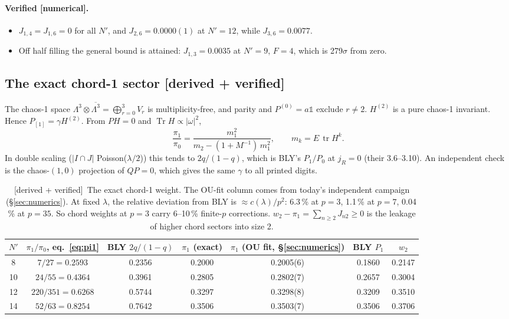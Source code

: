 \documentclass[11pt]{article}
\newcommand{\Tr}{\operatorname{Tr}}
\newcommand{\tr}{\operatorname{tr}}
\newcommand{\Np}{N'}
\newcommand{\one}{\mathds 1}
\newcommand{\tagbox}[2]{\textsf{\small\color{#1}[#2]}}
\newcommand{\VER}{\tagbox{cder}{derived + verified}}
\newcommand{\NUM}{\tagbox{cnum}{numerical}}
\theoremstyle{remark}
\begin{document}
\paragraph{Verified \NUM.}
\begin{itemize}\itemsep1pt
\item $J_{1,4}=J_{1,6}=0$ for all $\Np$, and $J_{2,6}=0.0000(1)$ at $\Np=12$, while $J_{3,6}=0.0077$.
\item Off half filling the general bound is attained: $J_{1,3}=0.0035$ at $\Np=9$, $F=4$, which is 279$\sigma$ from zero.
\end{itemize}

\subsection{The exact chord-1 sector \VER}
The chaos-1 space $\Lambda^3\otimes\overline{\Lambda^3}=\bigoplus_{r=0}^3V_r$ is multiplicity-free, and parity and
$P^{(0)}=a\one$ exclude $r\ne2$. $H^{(2)}$ is a pure chaos-1 invariant. Hence $P_{[1]}=\gamma H^{(2)}$. From $PH=0$ and
$\Tr H\propto|\omega|^2$,
\begin{equation}
\frac{\pi_1}{\pi_0}=\frac{m_1^2}{m_2-(1+M^{-1})\,m_1^2},\qquad m_k=E\,\tr H^k .
\label{eq:pi1}
\end{equation}
In double scaling ($|I\cap J|$ Poisson($\lambda/2$)) this tends to $2q/(1-q)$, which is BLY's $P_1/P_0$ at $j_R=0$
(their 3.6--3.10). An independent check is the chaos-$(1,0)$ projection of $QP=0$, which gives the same $\gamma$ to all
printed digits.

\begin{table}[!htbp]
\centering\small
\begin{tabular}{@{}ccccccc@{}}
\toprule
$\Np$ & $\pi_1/\pi_0$, eq.~\eqref{eq:pi1} & BLY $2q/(1-q)$ & $\pi_1$ (exact) & $\pi_1$ (OU fit, \S\ref{sec:numerics}) & BLY $P_1$ & $w_2$\\
\midrule
8 & $7/27=0.2593$ & 0.2356 & 0.2000 & 0.2005(6) & 0.1860 & 0.2147\\
10 & $24/55=0.4364$ & 0.3961 & 0.2805 & 0.2802(7) & 0.2657 & 0.3004\\
12 & $220/351=0.6268$ & 0.5744 & 0.3297 & 0.3298(8) & 0.3209 & 0.3510\\
14 & $52/63=0.8254$ & 0.7642 & 0.3506 & 0.3503(7) & 0.3506 & 0.3706\\
\bottomrule
\end{tabular}
\caption{\VER\ The exact chord-1 weight. The OU-fit column comes from today's independent campaign (\S\ref{sec:numerics}).
At fixed $\lambda$, the relative deviation from BLY is $\approx c(\lambda)/p^2$: 6.3\,\% at $p=3$, 1.1\,\% at $p=7$,
0.04\,\% at $p=35$. So chord weights at $p=3$ carry 6--10\,\% finite-$p$ corrections. $w_2-\pi_1=\sum_{n\ge2}J_{n2}\ge0$
is the leakage of higher chord sectors into size 2.}
\label{tab:pi1}
\end{table}
\end{document}
